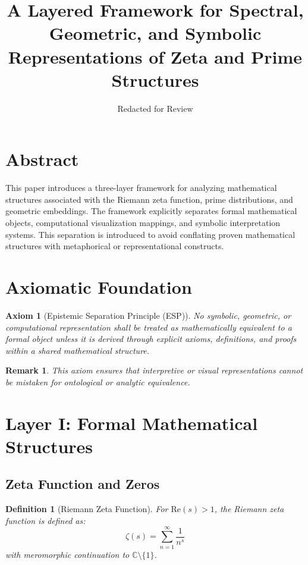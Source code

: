 \documentclass[11pt]{article}
\title{A Layered Framework for Spectral, Geometric, and Symbolic Representations of Zeta and Prime Structures}
\author{Redacted for Review}
\date{}
\newtheorem{definition}{Definition}
\newtheorem{remark}{Remark}
\newtheorem{axiom}{Axiom}
\begin{document}
\maketitle

\section{Abstract}

This paper introduces a three-layer framework for analyzing mathematical structures associated with the Riemann zeta function, prime distributions, and geometric embeddings. The framework explicitly separates formal mathematical objects, computational visualization mappings, and symbolic interpretation systems. This separation is introduced to avoid conflating proven mathematical structures with metaphorical or representational constructs.

\section{Axiomatic Foundation}

\begin{axiom}[Epistemic Separation Principle (ESP)]
No symbolic, geometric, or computational representation shall be treated as mathematically equivalent to a formal object unless it is derived through explicit axioms, definitions, and proofs within a shared mathematical structure.
\end{axiom}

\begin{remark}
This axiom ensures that interpretive or visual representations cannot be mistaken for ontological or analytic equivalence.
\end{remark}

\section{Layer I: Formal Mathematical Structures}

\subsection{Zeta Function and Zeros}

\begin{definition}[Riemann Zeta Function]
For $\mathrm{Re}(s) > 1$, the Riemann zeta function is defined as:
\[
\zeta(s) = \sum_{n=1}^{\infty} \frac{1}{n^s}
\]
with meromorphic continuation to $\mathbb{C} \setminus \{1\}$.
\end{definition}
\end{document}
